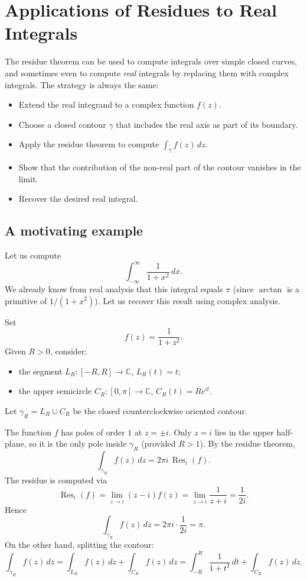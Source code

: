 
\section{Applications of Residues to Real Integrals}

The residue theorem can be used to compute integrals over simple closed curves, and sometimes even to compute \emph{real} integrals by replacing them with complex integrals. The strategy is always the same:
\begin{itemize}
\item Extend the real integrand to a complex function $f(z)$.
\item Choose a closed contour $\gamma$ that includes the real axis as part of its boundary.
\item Apply the residue theorem to compute $\int_\gamma f(z)\,dz$.
\item Show that the contribution of the non-real part of the contour vanishes in the limit.
\item Recover the desired real integral.
\end{itemize}

\subsection{A motivating example}

Let us compute
\[
\int_{-\infty}^{\infty} \frac{1}{1+x^2}\,dx.
\]
We already know from real analysis that this integral equals $\pi$ (since $\arctan$ is a primitive of $1/(1+x^2)$). Let us recover this result using complex analysis.

Set
\[
f(z)=\frac{1}{1+z^2}.
\]
Given $R>0$, consider:
\begin{itemize}
\item the segment $L_R:[-R,R]\to\mathbb{C}$, $L_R(t)=t$;
\item the upper semicircle $C_R:[0,\pi]\to\mathbb{C}$, $C_R(t)=Re^{it}$.
\end{itemize}
Let $\gamma_R=L_R\cup C_R$ be the closed counterclockwise oriented contour.

The function $f$ has poles of order $1$ at $z=\pm i$. Only $z=i$ lies in the upper half-plane, so it is the only pole inside $\gamma_R$ (provided $R>1$). By the residue theorem,
\[
\int_{\gamma_R} f(z)\,dz = 2\pi i\,\operatorname{Res}_i(f).
\]
The residue is computed via
\[
\operatorname{Res}_i(f)
=\lim_{z\to i}(z-i)f(z)
=\lim_{z\to i}\frac{1}{z+i}
=\frac{1}{2i}.
\]
Hence
\[
\int_{\gamma_R} f(z)\,dz = 2\pi i\cdot \frac{1}{2i}=\pi.
\]
On the other hand, splitting the contour:
\[
\int_{\gamma_R} f(z)\,dz
=\int_{L_R} f(z)\,dz + \int_{C_R} f(z)\,dz
=\int_{-R}^R \frac{1}{1+t^2}\,dt + \int_{C_R} f(z)\,dz.
\]

